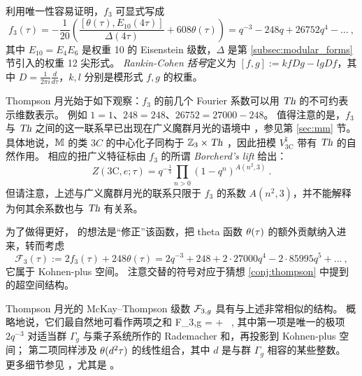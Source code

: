 利用唯一性容易证明，$f_3$ 可显式写成
\begin{equation}
\label{eq:by_hand_f3}
f_3(\tau)=-\frac{1}{20}\left(\frac{[\theta(\tau),E_{10}(4\tau)]}{\Delta(4\tau)}+608\theta(\tau)\right)=q^{-3}-248q+26752q^4-\dots~,
\end{equation}
其中 $E_{10}=E_4E_6$ 是权重 10 的 Eisenstein 级数，$\Delta$ 是第 \ref{subsec:modular_forms} 节引入的权重 12 尖形式。
\emph{Rankin-Cohen 括号}定义为 $[f,g]:=kfDg-lgDf$，其中 $D=\frac{1}{2\pi i}\frac{d}{d\tau}$，$k,l$ 分别是模形式 $f,g$ 的权重。

Thompson 月光始于如下观察：$f_3$ 的前几个 Fourier 系数可以用 $\operatorname{\textsl{Th}}$ 的不可约表示维数表示。
例如 $1=1$、$248=248$、$26752=27000-248$。
值得注意的是，$f_3$ 与 $\operatorname{\textsl{Th}}$ 之间的这一联系早已出现在广义魔群月光的语境中 \cite{DixonL.1988Batb,BorcherdsRichard1995AfoO,MR2904095}，参见第 \ref{sec:mm} 节。
具体地说，$\mathbb{M}$ 的类 $3C$ 的中心化子同构于 $\mathbb{Z}_3\times\operatorname{\textsl{Th}}$ \cite{conway_norton}，因此扭模 $V^\natural_{3\text{C}}$ 带有 $\operatorname{\textsl{Th}}$ 的自然作用。
相应的扭广义特征标由 $f_3$ 的所谓 \emph{Borcherd's lift} 给出：
\begin{equation}
Z(3\text{C},e;\tau)=q^{-\frac{1}{3}}\prod_{n>0}(1-q^n)^{A(n^2,3)}~.
\end{equation}
但请注意，上述与广义魔群月光的联系只限于 $f_3$ 的系数 $A(n^2,3)$，并不能解释为何其余系数也与 $\operatorname{\textsl{Th}}$ 有关系。



为了做得更好，\cite{Harvey:2015mca} 的想法是“修正”该函数，把 theta 函数 $\theta(\tau)$ 的额外贡献纳入进来，转而考虑
\begin{equation}
\mathcal{F}_3(\tau):=2f_3(\tau)+248\theta(\tau)=2q^{-3}+248+2\cdot27000q^4-2\cdot85995q^5+\dots~, 
\end{equation}
它属于 Kohnen-plus 空间。
注意交替的符号对应于猜想 \ref{conj:thompson} 中提到的超空间结构。

Thompson 月光的 McKay--Thompson 级数 ${\cal F}_{3,g}$ 具有与上述非常相似的结构。
概略地说，它们最自然地可看作两项之和
\be\label{thompson_mckaythompson}
{\cal F}_{3,g} = {} + ~,
\ee
其中第一项是唯一的极项 $2q^{-3}$ 对适当群 $\Gamma_g$ 与乘子系统所作的 Rademacher 和，再投影到 Kohnen-plus 空间；
第二项同样涉及 $\theta(d^2\tau)$ 的线性组合，其中 $d$ 是与群 $\Gamma_g$ 相容的某些整数。
更多细节参见 \cite{Harvey:2015mca}，尤其是 \cite{GriffinMichael2016Apot}。

